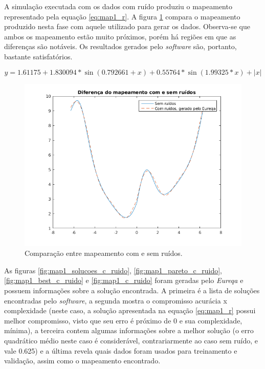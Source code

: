 	\FloatBarrier

A simulação executada com os dados com ruído produziu o mapeamento representado
pela equação \ref{eq:map1_r}. A figura \ref{fig:comparaca_map1}  compara o mapeamento produzido
nesta fase com aquele utilizado para gerar os dados. Observa-se que ambos os
mapeamento estão muito próximos, porém há regiões em que as diferenças são
notáveis. Os resultados gerados pelo \textit{software} são, portanto, bastante
satisfatórios.

\begin{equation}
y = 1.61175 + 1.830094*\sin(0.792661 + x) +
0.55764*\sin(1.99325*x) + |x|
\label{eq:map1_r}
\end{equation}

\FloatBarrier
\begin{figure}[H]
		  \centering
		  \includegraphics[width=0.65\linewidth]{image/comparacao_map1}
		  \caption{Comparação entre mapeamento com e sem ruídos.} 
		  \label{fig:comparaca_map1} 
		  
		\end{figure}
\FloatBarrier

As figuras \ref{fig:map1_solucoes_c_ruido}, \ref{fig:map1_pareto_c_ruido},
\ref{fig:map1_best_c_ruido}  e \ref{fig:map1_c_ruido} foram geradas pelo
\textit{Eureqa} e possuem informações sobre a solução encontrada. A primeira
é a lista de soluções encontradas pelo \textit{software}, a segunda mostra o
compromisso acurácia x complexidade (neste caso, a solução apresentada na
equação \ref{eq:map1_r} possui melhor compromisso, visto que seu erro é próximo
de 0 e sua complexidade, mínima), a terceira contem algumas informações sobre
a melhor solução (o erro quadrático médio neste caso é considerável,
contrariarmente ao caso sem ruído, e vale 0.625) e a última revela quais dados
foram usados para treinamento e validação, assim como o mapeamento encontrado.

\FloatBarrier
			    
